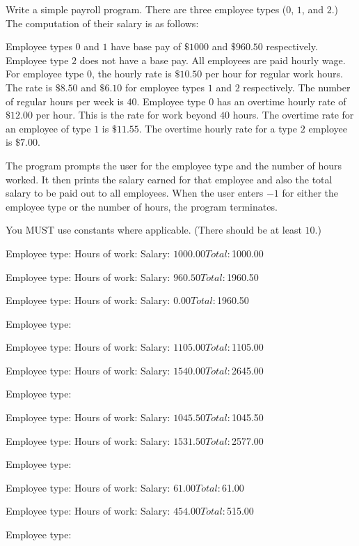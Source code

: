 Write a simple payroll program. There are three employee types ($0$, $1$, and
$2$.) The computation of their salary is as follows:
\begin{itemize}
  \li Employee types $0$ and $1$ have base pay of $\$1000$ and $\$960.50$
      respectively. Employee type $2$ does not have a base pay.
  \li All employees are paid hourly wage. For employee type $0$, the hourly
      rate is $\$10.50$ per hour for regular work hours. The rate is $\$8.50$
      and $\$6.10$ for employee types $1$ and $2$ respectively. The number of
      regular hours per week is $40$.
  \li Employee type $0$ has an overtime hourly rate of $\$12.00$ per hour.
      This is the rate for work beyond $40$ hours. The overtime rate for an
      employee of type $1$ is $\$11.55$. The overtime hourly rate for a type $2$
      employee is $\$7.00$.
\end{itemize}

The program prompts the user for the employee type and the number of hours
worked. It then prints the salary earned for that employee and also the
total salary to be paid out to all employees.
When the user enters $-1$ for either the employee type
or the number of hours, the program terminates.

You MUST use constants where applicable. (There should be at least $10$.)

\resett
\nextt
\begin{console}[commandchars=\\\{\}]
Employee type: 
Hours of work: 
Salary: $1000.00
Total: $1000.00

Employee type: 
Hours of work: 
Salary: $960.50
Total: $1960.50

Employee type: 
Hours of work: 
Salary: $0.00
Total: $1960.50

Employee type: 
\end{console}

\nextt
\begin{console}[commandchars=\\\{\}]
Employee type: 
Hours of work: 
Salary: $1105.00
Total: $1105.00

Employee type: 
Hours of work: 
Salary: $1540.00
Total: $2645.00

Employee type: 
\end{console}

\nextt
\begin{console}[commandchars=\\\{\}]
Employee type: 
Hours of work: 
Salary: $1045.50
Total: $1045.50

Employee type: 
Hours of work: 
Salary: $1531.50
Total: $2577.00

Employee type: 
\end{console}

\nextt
\begin{console}[commandchars=\\\{\}]
Employee type: 
Hours of work: 
Salary: $61.00
Total: $61.00

Employee type: 
Hours of work: 
Salary: $454.00
Total: $515.00

Employee type: 
\end{console}
